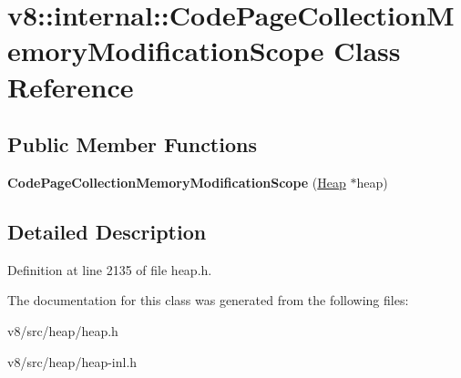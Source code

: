 \hypertarget{classv8_1_1internal_1_1CodePageCollectionMemoryModificationScope}{}\section{v8\+:\+:internal\+:\+:Code\+Page\+Collection\+Memory\+Modification\+Scope Class Reference}
\label{classv8_1_1internal_1_1CodePageCollectionMemoryModificationScope}
\subsection*{Public Member Functions}
\begin{DoxyCompactItemize}
\item 
\mbox{\label{classv8_1_1internal_1_1CodePageCollectionMemoryModificationScope_a4e270b5e3967b6f1a6dd340f3c99f84e}} 
{\bfseries Code\+Page\+Collection\+Memory\+Modification\+Scope} (\mbox{\hyperlink{classv8_1_1internal_1_1Heap}{Heap}} $\ast$heap)
\end{DoxyCompactItemize}


\subsection{Detailed Description}


Definition at line 2135 of file heap.\+h.



The documentation for this class was generated from the following files\+:\begin{DoxyCompactItemize}
\item 
v8/src/heap/heap.\+h\item 
v8/src/heap/heap-\/inl.\+h\end{DoxyCompactItemize}
